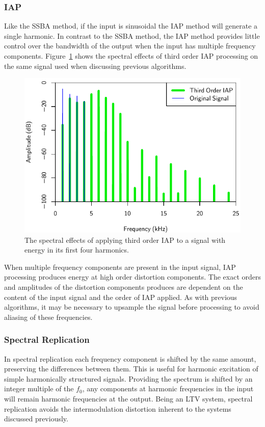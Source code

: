 		\subsubsection*{IAP}
			Like the SSBA method, if the input is sinusoidal the IAP method will generate a single harmonic. In
			contrast to the SSBA method, the IAP method provides little control over the bandwidth of the
			output when the input has multiple frequency components. Figure~\ref{fig:IAP3Spectra} shows the
			spectral effects of third order IAP processing on the same signal used when discussing previous
			algorithms.

			\begin{figure}[h!]
				\centering
				\includegraphics{chapter5/Images/IAP3Spectra.pdf}
				\caption{The spectral effects of applying third order IAP to a signal with energy in its 
				         first four harmonics.}
				\label{fig:IAP3Spectra}
			\end{figure}

			When multiple frequency components are present in the input signal, IAP processing produces energy
			at high order distortion components. The exact orders and amplitudes of the distortion components
			produces are dependent on the content of the input signal and the order of IAP applied. As with
			previous algorithms, it may be necessary to upsample the signal before processing to avoid aliasing
			of these frequencies.

		\subsubsection*{Spectral Replication}
			In spectral replication each frequency component is shifted by the same amount, preserving the
			differences between them. This is useful for harmonic excitation of simple harmonically structured
			signals. Providing the spectrum is shifted by an integer multiple of the $f_{0}$, any components at
			harmonic frequencies in the input will remain harmonic frequencies at the output. Being an LTV
			system, spectral replication avoids the intermodulation distortion inherent to the systems
			discussed previously. 

